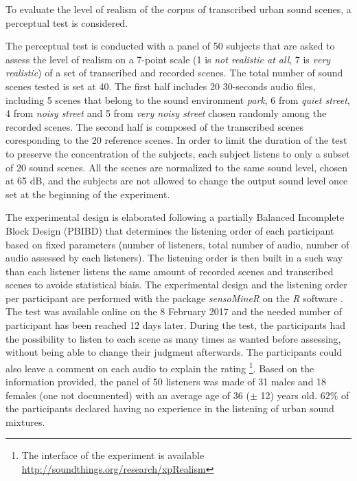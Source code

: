 \documentclass[review,5p,twocolumn,sort&compress,times]{elsarticle}
\begin{document}
To evaluate the level of realism of the corpus of transcribed urban sound scenes, a perceptual test is considered.

The perceptual test is conducted with a panel of 50 subjects that are asked to assess the level of realism on a 7-point scale (1 is \textit{not realistic at all}, 7 is \textit{very realistic}) of a set of transcribed and recorded scenes. The total number of sound scenes tested is set at 40. The first half includes 20 30-seconds audio files, including 5 scenes that belong to the sound environment \textit{park}, 6 from \textit{quiet street}, 4 from \textit{noisy street} and 5 from \textit{very noisy street} chosen randomly among the recorded scenes. The second half is composed of the transcribed scenes coresponding to the 20 reference scenes. In order to limit the duration of the test to preserve the concentration of the subjects, each subject listens to only a subset of 20 sound scenes. All the scenes are normalized to the same sound level, chosen at 65 dB, and the subjects are not allowed to change the output sound level once set at the beginning of the experiment.

The experimental design is elaborated following a partially Balanced Incomplete Block Design (PBIBD) \cite{john1977optimal} that determines the listening order of each participant based on fixed parameters (number of listeners, total number of audio, number of audio assessed by each listeners). The listening order is then built in a such way than each listener listens the same amount of recorded scenes and transcribed scenes to avoide statistical biais. The experimental design and the listening order per participant are performed with the package \textit{sensoMineR} on the \textit{R} software \cite{le_sensominer:_2008}.\\

The test was available online on the 8 February 2017 and the needed number of participant has been reached 12 days later. During the test, the participants had the possibility to listen to each scene as many times as wanted before assessing, without being able to change their judgment afterwards. The participants could also leave a comment on each audio to explain the rating \footnote{The interface of the experiment is available \url{http://soundthings.org/research/xpRealism}}. Based on the information provided, the panel of 50 listeners was made of 31 males and 18 females (one not documented) with an average age of 36 ($\pm$ 12) years old. $62\%$ of the participants declared having no experience in the listening of urban sound mixtures. 
\end{document}
